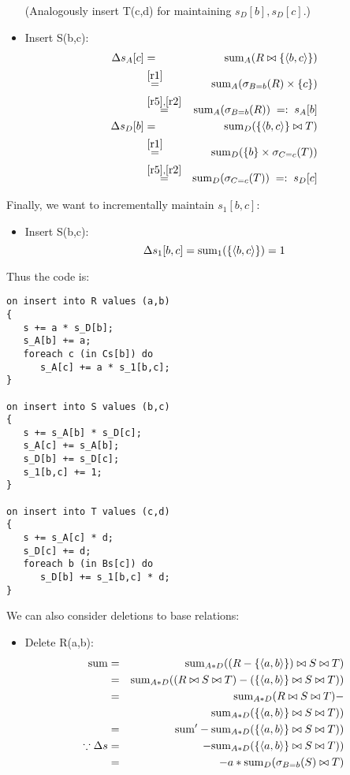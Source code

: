 \begin{example}
\begin{itemize}
(Analogously insert T(c,d) for maintaining $s_{D}[b], s_{D}[c]$.)

\item
Insert S(b,c):
\begin{eqnarray*}
\Delta s_A[c] &=&
\mathrm{sum}_{A}(R \bowtie \{{\langle b,c\rangle}\})
\\ &\stackrel{\ref{r1}}{=}&
\mathrm{sum}_{A}(\sigma_{B=b}(R) \times \{c\})
\\ &\stackrel{\ref{r5},\ref{r2}}{=}&
\mathrm{sum}_{A}(\sigma_{B=b}(R))
\;=:\; s_A[b]
\\
\Delta s_D[b] &=&
\mathrm{sum}_{D}(\{{\langle b,c\rangle}\} \bowtie T)
\\ &\stackrel{\ref{r1}}{=}&
\mathrm{sum}_{D}(\{b\} \times \sigma_{C=c}(T))
\\ &\stackrel{\ref{r5},\ref{r2}}{=}&
\mathrm{sum}_{D}(\sigma_{C=c}(T))
\;=:\; s_D[c]
\end{eqnarray*}
\end{itemize}

Finally, we want to incrementally maintain $s_1[b,c]$:
\begin{itemize}
\item
Insert S(b,c):
\[
\Delta s_1[b,c] =
\mathrm{sum}_{1}(\{{\langle b,c\rangle}\}) = 1
\]
\end{itemize}

Thus the code is:
\begin{verbatim}
on insert into R values (a,b)
{
   s += a * s_D[b];
   s_A[b] += a;
   foreach c (in Cs[b]) do
      s_A[c] += a * s_1[b,c];
}

on insert into S values (b,c)
{
   s += s_A[b] * s_D[c];
   s_A[c] += s_A[b];
   s_D[b] += s_D[c];
   s_1[b,c] += 1;
}

on insert into T values (c,d)
{
   s += s_A[c] * d;
   s_D[c] += d;
   foreach b (in Bs[c]) do
      s_D[b] += s_1[b,c] * d;
}
\end{verbatim}
\punto

We can also consider deletions to base relations:

\begin{itemize}
\item
Delete R(a,b):
\begin{eqnarray*}
\mathrm{sum} &=& \mathrm{sum}_{A*D}((R-\{{\langle a,b\rangle}\}) \bowtie S \bowtie T)\\
&=& \mathrm{sum}_{A*D}((R \bowtie S \bowtie T) -
(\{{\langle a,b\rangle}\} \bowtie S \bowtie T))\\
&=& \mathrm{sum}_{A*D}(R \bowtie S \bowtie T) -\\
& & \mathrm{sum}_{A*D}(\{{\langle a,b\rangle}\} \bowtie S \bowtie T))\\
&=& \mathrm{sum}' - \mathrm{sum}_{A*D}(\{{\langle a,b\rangle}\} \bowtie S \bowtie T))\\
\because \Delta s &=&  - \mathrm{sum}_{A*D}(\{{\langle a,b\rangle}\} \bowtie S \bowtie T))\\
&=& -a*\mathrm{sum}_{D}(\sigma_{B=b}(S) \bowtie T)
\end{eqnarray*} 
\end{itemize}


\end{example}

